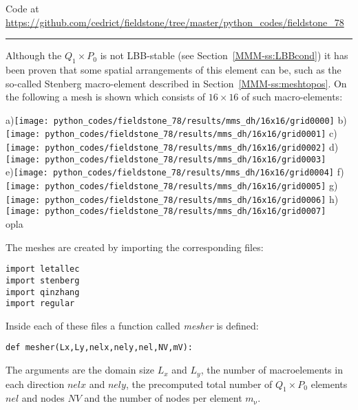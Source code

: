 

\begin{center}
Code at \url{https://github.com/cedrict/fieldstone/tree/master/python_codes/fieldstone_78}
\end{center}

\par\noindent\rule{\textwidth}{0.4pt}



Although the $Q_1\times P_0$ is not LBB-stable (see Section~\ref{MMM-ss:LBBcond})
it has been proven that some spatial arrangements of this element can be, such as the
so-called Stenberg macro-element described in Section~\ref{MMM-ss:meshtopos}.
On the following a mesh is shown which consists of $16\times 16$ of such macro-elements:

\begin{center}
a)\texttt{[image: python\_codes/fieldstone\_78/results/mms\_dh/16x16/grid0000]}
b)\texttt{[image: python\_codes/fieldstone\_78/results/mms\_dh/16x16/grid0001]}
c)\texttt{[image: python\_codes/fieldstone\_78/results/mms\_dh/16x16/grid0002]}
d)\texttt{[image: python\_codes/fieldstone\_78/results/mms\_dh/16x16/grid0003]}\\
e)\texttt{[image: python\_codes/fieldstone\_78/results/mms\_dh/16x16/grid0004]}
f)\texttt{[image: python\_codes/fieldstone\_78/results/mms\_dh/16x16/grid0005]}
g)\texttt{[image: python\_codes/fieldstone\_78/results/mms\_dh/16x16/grid0006]}
h)\texttt{[image: python\_codes/fieldstone\_78/results/mms\_dh/16x16/grid0007]}\\
{\captionfont  opla}
\end{center}

The meshes are created by importing the corresponding files:
\begin{lstlisting} 
import letallec
import stenberg
import qinzhang
import regular
\end{lstlisting} 
Inside each of these files a function called {\sl mesher} is defined: 
\begin{lstlisting} 
def mesher(Lx,Ly,nelx,nely,nel,NV,mV):
\end{lstlisting} 
The arguments are the domain size $L_x$ and $L_y$, the number of macroelements
in each direction $nelx$ and $nely$, the precomputed total number of $Q_1\times P_0$ 
elements $nel$ and nodes $NV$ and the number of nodes per element $m_\upnu$.  

